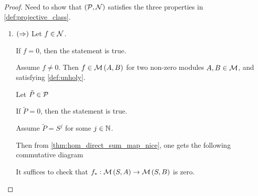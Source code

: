 \begin{proof}
    Need to show that \( \left(  {\mathcal{P}}, {\mathcal{N}}  \right) \) satisfies the three properties in \autoref{def:projective_class}.

    \begin{enumerate}
        \item {
            \( \left(  \Rightarrow  \right) \) Let \( f \in {\mathcal{N}} \).

            If \( f = 0 \), then the statement is true.

            Assume \( f \neq 0 \). Then \( f \in {\mathcal{M}}\left( A, B \right) \) for two non-zero modules \( A, B \in {\mathcal{M}} \), and satisfying \autoref{def:unholy}.
            
            Let \( \tilde{P} \in {\mathcal{P}} \)
            
            If \( \tilde{P} = 0 \), then the statement is true.

            Assume \( \tilde{P} = S^j \) for some \( j \in {\mathbb{N}} \).

            Then from \autoref{thm:hom_direct_sum_map_nice}, one gets the following commutative diagram
            \begin{center}
            \end{center}
            It suffices to check that \( f_*: {\mathcal{M}}\left( S, A \right) \to {\mathcal{M}}\left( S, B \right) \) is zero.

}
\end{enumerate}
\end{proof}
